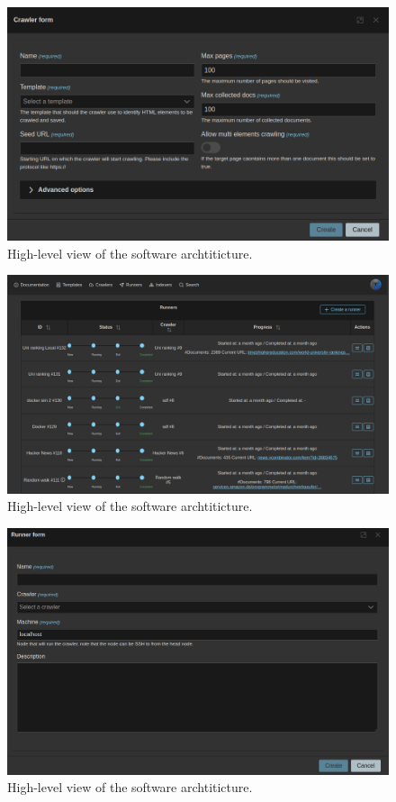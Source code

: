 \begin{figure}[h]	
     \centering
     \includegraphics[width=13cm]{images/demo-7.png}
     \caption{High-level view of the software archtiticture.}
     \label{fig:software-arch}
\end{figure}

\begin{figure}[h]	
     \centering
     \includegraphics[width=13cm]{images/demo-8.png}
     \caption{High-level view of the software archtiticture.}
     \label{fig:software-arch}
\end{figure}

\begin{figure}[h]	
     \centering
     \includegraphics[width=13cm]{images/demo-9.png}
     \caption{High-level view of the software archtiticture.}
     \label{fig:software-arch}
\end{figure}

